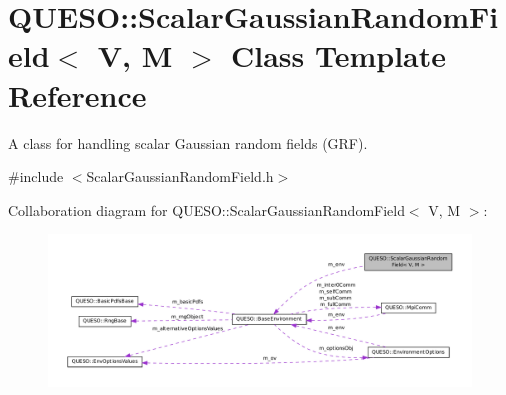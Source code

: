 \hypertarget{class_q_u_e_s_o_1_1_scalar_gaussian_random_field}{\section{Q\-U\-E\-S\-O\-:\-:Scalar\-Gaussian\-Random\-Field$<$ V, M $>$ Class Template Reference}
\label{class_q_u_e_s_o_1_1_scalar_gaussian_random_field}
}


A class for handling scalar Gaussian random fields (G\-R\-F).  




{\ttfamily \#include $<$Scalar\-Gaussian\-Random\-Field.\-h$>$}



Collaboration diagram for Q\-U\-E\-S\-O\-:\-:Scalar\-Gaussian\-Random\-Field$<$ V, M $>$\-:
\nopagebreak
\begin{figure}[H]
\begin{center}
\leavevmode
\includegraphics[width=350pt]{class_q_u_e_s_o_1_1_scalar_gaussian_random_field__coll__graph}
\end{center}
\end{figure}
